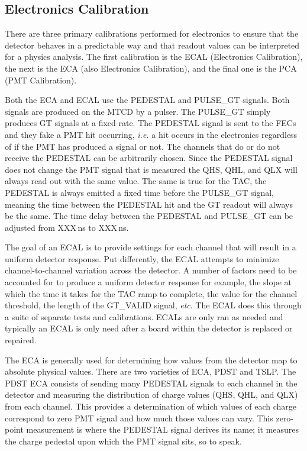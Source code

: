 \subsection{Electronics Calibration}
There are three primary calibrations performed for electronics to ensure that the
detector behaves in a predictable way and that readout values can be interpreted
for a physics analysis. The first calibration is the ECAL (Electronics Calibration),
the next is the ECA (also Electronics Calibration), and the final one is the PCA (PMT
Calibration).

Both the ECA and ECAL use the PEDESTAL and PULSE\_GT signals. Both signals
are produced on the MTCD by a pulser.
The PULSE\_GT simply produces GT signals at a fixed rate.
The PEDESTAL signal is sent to the FECs and they fake a PMT hit occurring,
\textit{i.e.} a hit occurs in the electronics regardless of if the PMT has
produced a signal or not.
The channels that do or do not receive the PEDESTAL can be arbitrarily chosen.
Since the PEDESTAL signal does not change the PMT signal that is measured the
QHS, QHL, and QLX will always read out with the same value. The same is true
for the TAC, the PEDESTAL is always emitted a fixed time before the PULSE\_GT
signal, meaning the time between the PEDESTAL hit and the GT readout will always
be the same.
The time delay between the PEDESTAL and PULSE\_GT can be adjusted from
XXX\,ns to XXX\,ns.


The goal of an ECAL is to provide settings for each channel that will result in a uniform
detector response. Put differently, the ECAL attempts to minimize channel-to-channel variation
across the detector.
A number of factors need to be accounted for to produce a uniform detector response for example,
the slope at which the time it takes for the TAC ramp to complete, the value for the
channel threshold, the length of the GT\_VALID signal, \textit{etc}.
The ECAL does this through a suite of separate tests and calibrations.
ECALs are only ran as needed and typically an ECAL is only need after a board within the
detector is replaced or repaired.

The ECA is generally used for determining how values from the detector map to absolute
physical values.
There are two varieties of ECA,  PDST and  TSLP.
The PDST ECA consists of sending many PEDESTAL signals to each channel in the detector and
measuring the distribution of charge values (QHS, QHL, and QLX) from each channel.
This provides a determination of which values of each charge correspond to zero PMT
signal and how much those values can vary.
This zero-point measurement is where the PEDESTAL signal derives its name; it measures
the charge pedestal upon which the PMT signal sits, so to speak.


